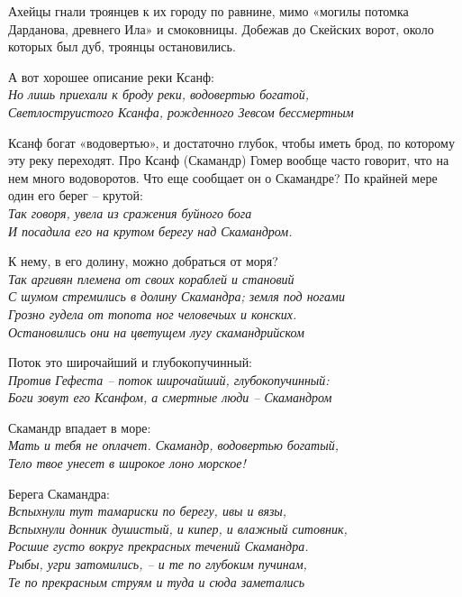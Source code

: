 Ахейцы гнали троянцев к их городу по равнине, мимо «могилы потомка Дарданова, древнего Ила» и смоковницы. Добежав до Скейских ворот, около которых был дуб, троянцы остановились. 

А вот хорошее описание реки Ксанф:\\

\noindent
\textit{Но лишь приехали к броду реки, водовертью богатой,\\
Светлоструистого Ксанфа, рожденного Зевсом бессмертным\\}

Ксанф богат «водовертью», и достаточно глубок, чтобы иметь брод, по которому эту реку переходят. Про Ксанф (Скамандр) Гомер вообще часто говорит, что на нем много водоворотов. Что еще сообщает он о Скамандре? По крайней мере один его берег – крутой:\\

\noindent
\textit{Так говоря, увела из сражения буйного бога\\
И посадила его на крутом берегу над Скамандром.\\}

К нему, в его долину, можно добраться от моря?\\

\noindent
\textit{Так аргивян племена от своих кораблей и становий\\
С шумом стремились в долину Скамандра; земля под ногами\\
Грозно гудела от топота ног человечьих и конских.\\
Остановились они на цветущем лугу скамандрийском\\}
 
Поток это широчайший и глубокопучинный:\\

\noindent
\textit{Против Гефеста – поток широчайший, глубокопучинный:\\
Боги зовут его Ксанфом, а смертные люди – Скамандром\\}

Скамандр впадает в море:\\

\noindent
\textit{Мать и тебя не оплачет. Скамандр, водовертью богатый,\\
Тело твое унесет в широкое лоно морское!\\}

Берега Скамандра:\\

\noindent
\textit{Вспыхнули тут тамариски по берегу, ивы и вязы,\\
Вспыхнули донник душистый, и кипер, и влажный ситовник,\\
Росшие густо вокруг прекрасных течений Скамандра.\\
 Рыбы, угри затомились, – и те по глубоким пучинам,\\
Те по прекрасным струям и туда и сюда заметались\\}

